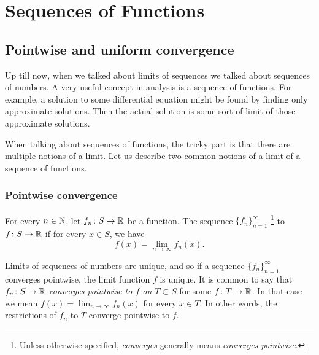 \chapter{Sequences of Functions} \label{fs:chapter}


\section{Pointwise and uniform convergence}
\label{sec:puconv}


Up till now, when we talked about limits of sequences we talked about
sequences of numbers.
A very useful concept in analysis is a sequence of functions.
For example, a solution to some differential equation
might be found by finding only approximate solutions.
Then the actual solution is some sort of limit of those approximate solutions.

When talking about sequences of functions, the 
tricky part is that there are multiple notions of a limit.
Let us describe two common
notions of a limit of a sequence of functions.

\subsection{Pointwise convergence}

\begin{defn}
For every $n \in {\mathbb{N}}$,
let $f_n \colon S \to {\mathbb{R}}$ be a function.  The sequence
$\{ f_n \}_{n=1}^\infty$
\emph{}\footnote{Unless otherwise specified,
\emph{converges} generally means \emph{converges pointwise}.}
to $f \colon S \to {\mathbb{R}}$ if for every $x
\in S$,
we have
\begin{equation*}
f(x) =
\lim_{n\to\infty} f_n(x) .
\end{equation*}
\end{defn}

Limits of sequences of numbers are unique, and so if a sequence
$\{ f_n \}_{n=1}^\infty$
converges pointwise, the limit function $f$ is unique.
It is common to say that $f_n \colon S \to {\mathbb{R}}$
\emph{converges pointwise to $f$ on $T \subset S$}
for some $f \colon T \to {\mathbb{R}}$.  In that case we mean 
$f(x) = \lim_{n\to\infty} f_n(x)$ for every $x \in T$.  In other words, the
restrictions of $f_n$ to $T$ converge pointwise to $f$.


